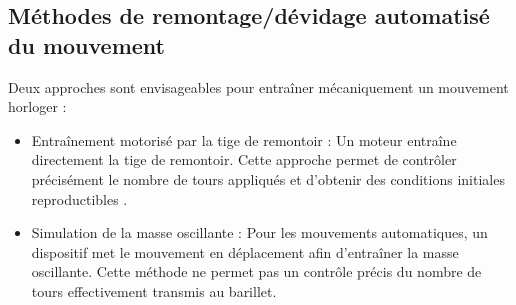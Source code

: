 \subsection{Méthodes de remontage/dévidage automatisé du mouvement}

Deux approches sont envisageables pour entraîner mécaniquement un mouvement horloger :

\begin{itemize}
    \item Entraînement motorisé par la tige de remontoir :
    Un moteur entraîne directement la tige de remontoir. Cette approche permet de contrôler précisément le nombre de tours appliqués et d'obtenir des conditions initiales reproductibles \cite{UNIMEC_Remontage}.

    \item Simulation de la masse oscillante :
    Pour les mouvements automatiques, un dispositif met le mouvement en déplacement afin d'entraîner la masse oscillante. Cette méthode ne permet pas un contrôle précis du nombre de tours effectivement transmis au barillet.
\end{itemize}

